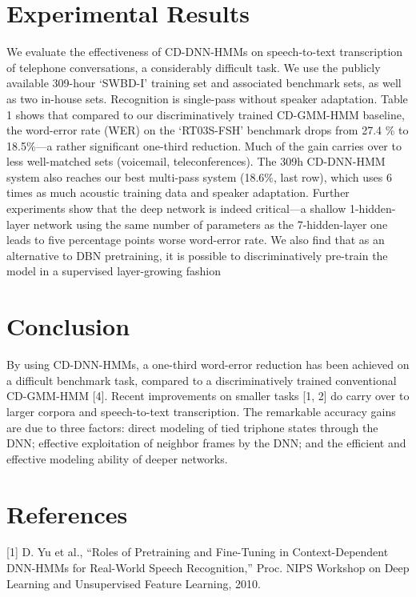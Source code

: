 \documentclass{article}
\begin{document}
\begin{multicols}{2}
\section{Experimental Results}
We evaluate the effectiveness of CD-DNN-HMMs on
speech-to-text transcription of telephone conversations, a considerably difficult task. We use the publicly available 309-hour ‘SWBD-I’ training set and associated benchmark sets, as well as two in-house sets.
Recognition is single-pass without speaker adaptation.
Table 1 shows that compared to our discriminatively
trained CD-GMM-HMM baseline, the word-error rate
(WER) on the ‘RT03S-FSH’ benchmark drops from 27.4 
$\%$
to 18.5$\%$—a rather significant one-third reduction. Much of the gain carries over to less well-matched
sets (voicemail, teleconferences). The 309h CD-DNN-HMM system also reaches our best multi-pass system (18.6$\%$, last row), which uses 6 times as much acoustic
training data and speaker adaptation.
Further experiments show that the deep network is indeed critical—a shallow 1-hidden-layer network using
the same number of parameters as the 7-hidden-layer
one leads to five percentage points worse word-error
rate. We also find that as an alternative to DBN pretraining, it is possible to discriminatively pre-train the
model in a supervised layer-growing fashion


\section{Conclusion}
By using CD-DNN-HMMs, a one-third word-error reduction has been achieved on a difficult benchmark
task, compared to a discriminatively trained conventional CD-GMM-HMM [4]. Recent improvements on
smaller tasks [1, 2] do carry over to larger corpora and
speech-to-text transcription. The remarkable accuracy
gains are due to three factors: direct modeling of tied
triphone states through the DNN; effective exploitation of neighbor frames by the DNN; and the efficient
and effective modeling ability of deeper networks.
\vfill\null
\columnbreak
\section*{References}

[1] D. Yu et al., “Roles of Pretraining and Fine-Tuning
in Context-Dependent DNN-HMMs for Real-World
Speech Recognition,” Proc. NIPS Workshop on Deep
Learning and Unsupervised Feature Learning, 2010.


\end{multicols}
\end{document}
